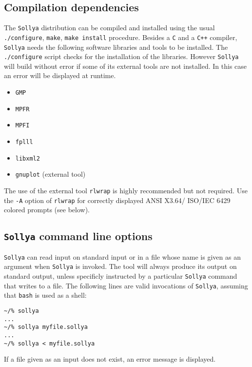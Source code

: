 \documentclass[a4paper]{article}
\newcommand{\sollya}{\texttt{Sollya}\xspace}
\begin{document}
\subsection{Compilation dependencies}

The \sollya distribution can be compiled and installed using the usual
\texttt{./configure}, \texttt{make}, \texttt{make install}
procedure. Besides a \texttt{C} and a \texttt{C++} compiler, \sollya needs the following
software libraries and tools to be installed. The \texttt{./configure}
script checks for the installation of the libraries. However \sollya
will build without error if some of its external tools are not
installed. In this case an error will be displayed at runtime.
\begin{itemize}
\item \texttt{GMP}
\item \texttt{MPFR}
\item \texttt{MPFI}
\item \texttt{fplll}
\item \texttt{libxml2}
\item \texttt{gnuplot} (external tool)
\end{itemize}
The use of the external tool \texttt{rlwrap} is highly recommended but
not required. Use the \texttt{-A} option of \texttt{rlwrap} for
correctly displayed ANSI X3.64/ ISO/IEC 6429 colored prompts (see
below).

\subsection{\sollya command line options}

\sollya can read input on standard input or in a file whose name is given 
as an argument when \sollya is invoked. The tool will always produce its 
output on standard output, unless specificly instructed by a particular
\sollya command that writes to a file.
The following lines are valid invocations of \sollya, assuming that 
\texttt{bash} is used as a shell:
\begin{center}\begin{minipage}{15cm}\begin{Verbatim}[frame=single]
~/% sollya
...
~/% sollya myfile.sollya
...
~/% sollya < myfile.sollya
\end{Verbatim}
\end{minipage}\end{center}
If a file given as an input does not exist, an error message is displayed.
\end{document}
